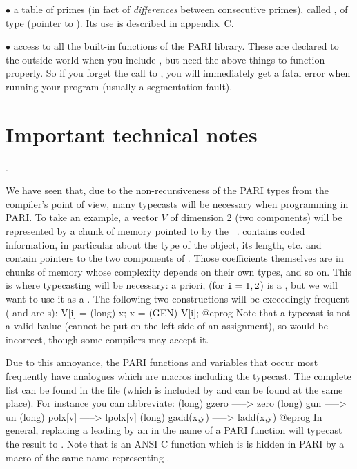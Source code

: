 $\bullet$ a table of primes (in fact of {\it differences\/} between
consecutive primes), called , of type 
(pointer to ). Its use is described in appendix~C.

$\bullet$ access to all the built-in functions of the PARI library.
These are declared to the outside world when you include , but
need the above things to function properly. So if you forget the call to
, you will immediately get a fatal error when running your
program (usually a segmentation fault).

\section{Important technical notes}

.\label{se:typecast}

\noindent
We have seen that, due to the non-recursiveness of the PARI types from the
compiler's point of view, many typecasts will be necessary when programming
in PARI. To take an example, a vector $V$ of dimension 2 (two components)
will be represented by a chunk of memory pointed to by the ~.
 contains coded information, in particular about the type of the
object, its length, etc.  and  contain pointers to
the two components of . Those coefficients  themselves are in
chunks of memory whose complexity depends on their own types, and so on. This
is where typecasting will be necessary: a priori,  (for
${\tt i}=1,2$) is a , but we will want to use it as a .
The following two constructions will be exceedingly frequent ( and
 are s):
%
\bprog
  V[i] = (long) x;
  x = (GEN) V[i];
@eprog
\noindent Note that a typecast is not a valid lvalue (cannot be put on the
left side of an assignment), so  would be incorrect, though
some compilers may accept it.

Due to this annoyance, the PARI functions and variables that occur most
frequently have analogues which are macros including the typecast. The complete
list can be found in the file  (which is included by
 and can be found at the same place). For instance you can
abbreviate:
%
\bprog
(long) gzero     ----->  zero
(long) gun       ----->  un
(long) polx[v]   ----->  lpolx[v]
(long) gadd(x,y) ----->  ladd(x,y)
@eprog\noindent%
%
%
In general, replacing a leading  by an  in the name of a PARI
function will typecast the result to . Note that  is an
ANSI C function which is is hidden in PARI by a macro of the same name
representing .

